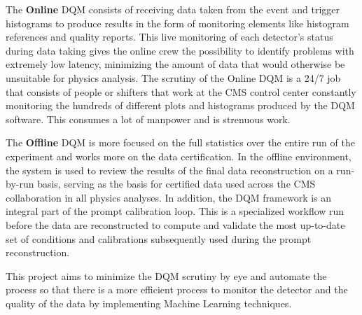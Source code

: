 The \textbf{Online} DQM consists of receiving data taken from the event and trigger histograms to produce results in the form of monitoring elements like histogram references and quality reports. This live monitoring of each detector’s status during data taking gives the online crew the possibility to identify problems with extremely low latency, minimizing the amount of data that would otherwise be unsuitable for physics analysis. The scrutiny of the Online DQM is a 24/7 job that consists of people or shifters that work at the CMS control center constantly monitoring the hundreds of different plots and histograms produced by the DQM software. This consumes a lot of manpower and is strenuous work.


The \textbf{Offline} DQM is more focused on the full statistics over the entire run of the experiment and works more on the data certification. In the offline environment, the system is used to review the results of the final data reconstruction on a run-by-run basis, serving as the basis for certified data used across the CMS collaboration in all physics analyses. In addition, the DQM framework is an integral part of the prompt calibration loop. This is a specialized workflow run before the data are reconstructed to compute and validate the most up-to-date set of conditions and calibrations subsequently used during the prompt reconstruction.

This project aims to minimize the DQM scrutiny by eye and automate the process so that there is a more efficient process to monitor the detector and the quality of the data by implementing Machine Learning techniques.